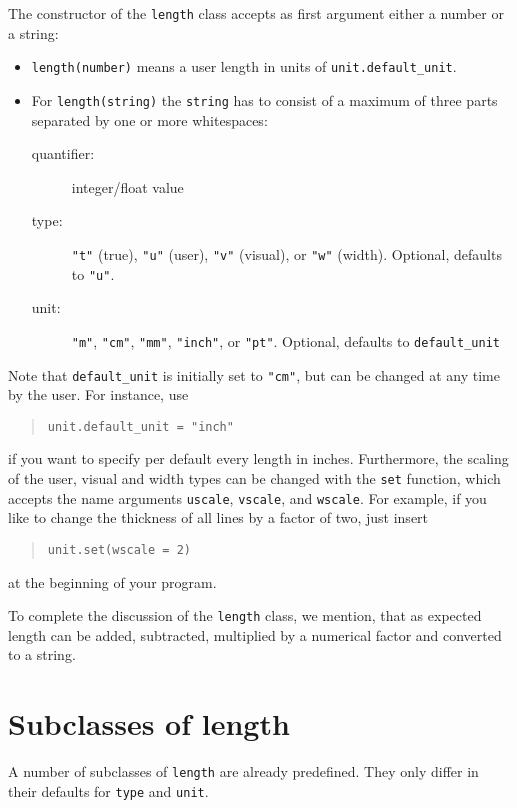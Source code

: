 The constructor of the \verb|length| class accepts as first argument
either a number or a string:
\begin{itemize}
\item \verb|length(number)| means a user length in units of \verb|unit.default_unit|.
\item For \verb|length(string)| the \verb|string| has to consist of a
  maximum of three parts separated by one or more whitespaces:
\begin{description}
\item[quantifier:] integer/float value
\item[type:] \verb|"t"| (true), \verb|"u"| (user), \verb|"v"| (visual), or \verb|"w"| (width).
  Optional, defaults to \verb|"u"|.
\item[unit:] \verb|"m"|, \verb|"cm"|, \verb|"mm"|, \verb|"inch"|, or
  \verb|"pt"|. Optional, defaults to \verb|default_unit|
\end{description}
\end{itemize}
Note that \verb|default_unit| is initially set to \verb|"cm"|,
but can be changed at any time by the user. For instance, use
\begin{quote}
\begin{verbatim}
unit.default_unit = "inch"
\end{verbatim}
\end{quote}
if you want to specify per default every length in inches.
Furthermore, the scaling of the user, visual and width types can be
changed with the \verb|set| function, which accepts the name arguments
\verb|uscale|, \verb|vscale|, and \verb|wscale|. For example, if you
like to change the thickness of all lines by a factor of two, just
insert
\begin{quote}
\begin{verbatim}
unit.set(wscale = 2)
\end{verbatim}
\end{quote}
at the beginning of your program.

To complete the discussion of the \verb|length| class, we mention,
that as expected \PyX{} length can be added, subtracted, multiplied by
a numerical factor and converted to a string.

\section{Subclasses of length}

A number of subclasses of \verb|length| are already predefined. They
only differ in their defaults for \verb|type| and \verb|unit|.

